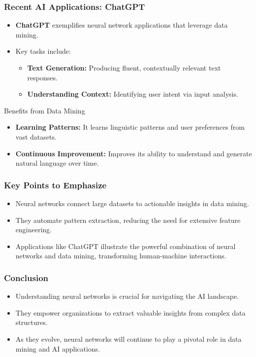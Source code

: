 \documentclass[aspectratio=169]{beamer}
\begin{document}
\begin{frame}[fragile]
    \frametitle{Recent AI Applications: ChatGPT}

    \begin{itemize}
        \item \textbf{ChatGPT} exemplifies neural network applications that leverage data mining.
        \item Key tasks include:
        \begin{itemize}
            \item \textbf{Text Generation:} Producing fluent, contextually relevant text responses.
            \item \textbf{Understanding Context:} Identifying user intent via input analysis.
        \end{itemize}
    \end{itemize}
    
    \begin{block}{Benefits from Data Mining}
        \begin{itemize}
            \item \textbf{Learning Patterns:} It learns linguistic patterns and user preferences from vast datasets.
            \item \textbf{Continuous Improvement:} Improves its ability to understand and generate natural language over time.
        \end{itemize}
    \end{block}
\end{frame}

\begin{frame}[fragile]
    \frametitle{Key Points to Emphasize}
    
    \begin{itemize}
        \item Neural networks connect large datasets to actionable insights in data mining.
        \item They automate pattern extraction, reducing the need for extensive feature engineering.
        \item Applications like ChatGPT illustrate the powerful combination of neural networks and data mining, transforming human-machine interactions.
    \end{itemize}
\end{frame}

\begin{frame}[fragile]
    \frametitle{Conclusion}
    
    \begin{itemize}
        \item Understanding neural networks is crucial for navigating the AI landscape.
        \item They empower organizations to extract valuable insights from complex data structures.
        \item As they evolve, neural networks will continue to play a pivotal role in data mining and AI applications.
    \end{itemize}
\end{frame}
\end{document}
